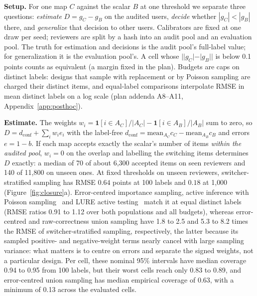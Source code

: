 \documentclass[sigconf,anonymous,review]{acmart}
\begin{document}
\textbf{Setup.} For one map $C$ against the scalar $B$ at one threshold we
separate three questions: \emph{estimate} $D=g_C-g_B$ on the audited
users, \emph{decide} whether $|g_C|<|g_B|$ there, and \emph{generalize}
that decision to other users. Calibrators are fixed at one draw per seed;
reviewers are split by a hash into an audit pool and an evaluation pool.
The truth for estimation and decisions is the audit pool's full-label
value; for generalization it is the evaluation pool's. A cell whose
$||g_C|-|g_B||$ is below 0.1 points counts as equivalent (a margin fixed
in the plan). Budgets are
caps on distinct labels: designs that sample with replacement or by
Poisson sampling are charged their distinct items, and equal-label
comparisons interpolate RMSE in mean distinct labels on a log scale (plan
addenda A8--A11, Appendix~\ref{app:posthoc}).

\textbf{Estimate.} The weights
$w_i=\mathbf 1[i\in A_C]/|A_C|-\mathbf 1[i\in A_B]/|A_B|$ sum to zero,
so $D=d_{\text{conf}}+\sum_iw_ie_i$ with the label-free
$d_{\text{conf}}=\mathrm{mean}_{A_C}c_C-\mathrm{mean}_{A_B}c_B$ and errors
$e=1-b$. If each map accepts exactly the scalar's number of items
\emph{within the audited pool}, $w_i=0$ on the overlap and labelling the
switching items determines $D$ exactly: a median of 70 of about 6{,}300
accepted items on seen reviewers and 140 of 11{,}800 on unseen ones. At
fixed thresholds on unseen reviewers, switcher-stratified sampling has
RMSE $0.64$ points at 100 labels and $0.18$ at 1{,}000
(Figure~\ref{fig:closure}a). Error-centred importance sampling, active
inference with Poisson sampling~\cite{zrnic2024active} and LURE active
testing~\cite{kossen2021active} match it at equal distinct labels (RMSE
ratios 0.91 to 1.12 over both populations and all budgets), whereas error-centred and raw-correctness union sampling have
1.8 to 2.5 and 5.3 to 8.2 times the RMSE of
switcher-stratified sampling, respectively, the latter because its sampled positive- and negative-weight terms nearly
cancel with large sampling variance: what matters is to
centre on errors and separate the signed weights, not a particular
design. Per cell, these nominal 95\% intervals have median coverage 0.94 to 0.95
from 100 labels, but their worst cells reach only 0.83 to 0.89, and error-centred union sampling has median empirical coverage of 0.63,
with a minimum of 0.13 across the evaluated cells.
\end{document}
